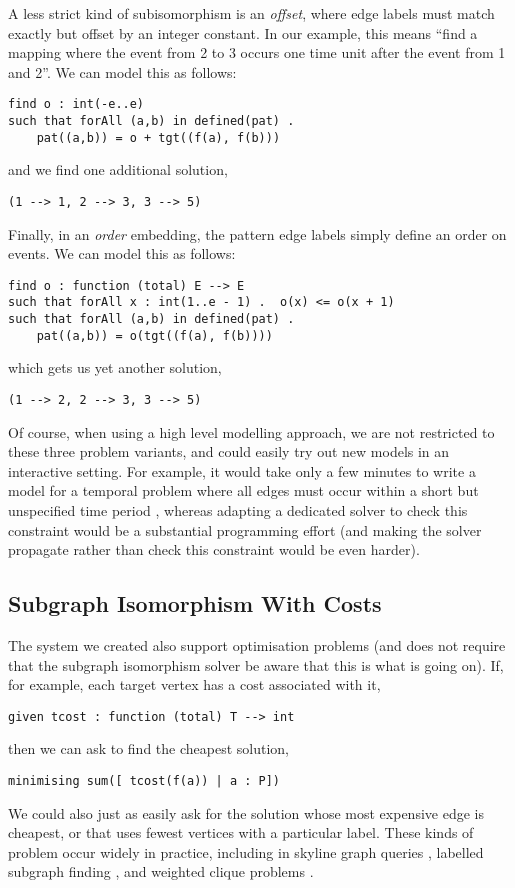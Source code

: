 \documentclass[runningheads]{llncs}
\begin{document}
A less strict kind of subisomorphism is an \emph{offset}, where edge labels must match exactly but
offset by an integer constant. In our example, this means ``find a mapping where the event from 2
to 3 occurs one time unit after the event from 1 and 2''. We can model this as follows:
\begin{lstlisting}
find o : int(-e..e)
such that forAll (a,b) in defined(pat) .
    pat((a,b)) = o + tgt((f(a), f(b)))
\end{lstlisting}
and we find one additional solution,
\begin{lstlisting}
(1 --> 1, 2 --> 3, 3 --> 5)
\end{lstlisting}

Finally, in an \emph{order} embedding, the pattern edge labels simply define an order on events. We
can model this as follows:
\begin{lstlisting}
find o : function (total) E --> E
such that forAll x : int(1..e - 1) .  o(x) <= o(x + 1)
such that forAll (a,b) in defined(pat) .
    pat((a,b)) = o(tgt((f(a), f(b))))
\end{lstlisting}
which gets us yet another solution,
\begin{lstlisting}
(1 --> 2, 2 --> 3, 3 --> 5)
\end{lstlisting}

Of course, when using a high level modelling approach, we are not restricted to these three problem
variants, and could easily try out new models in an interactive setting. For example, it would take
only a few minutes to write a model for a temporal problem where all edges must occur within a short
but unspecified time period \cite{DBLP:conf/asunam/RedmondC13}, whereas adapting a dedicated solver
to check this constraint would be a substantial programming effort (and making the solver propagate
rather than check this constraint would be even harder).

\subsection{Subgraph Isomorphism With Costs}

The system we created also support optimisation problems (and does not require that the subgraph
isomorphism solver be aware that this is what is going on). If, for example, each target vertex has
a cost associated with it,
\begin{lstlisting}
given tcost : function (total) T --> int
\end{lstlisting}
then we can ask to find the cheapest solution,
\begin{lstlisting}
minimising sum([ tcost(f(a)) | a : P])
\end{lstlisting}
We could also just as easily ask for the solution whose most expensive edge is cheapest, or that
uses fewest vertices with a particular label. These kinds of problem occur widely in practice,
including in skyline graph queries \cite{DBLP:journals/pvldb/PandeR017}, labelled subgraph finding
\cite{DBLP:conf/colognetwente/DellOlmoCC11}, and weighted clique problems
\cite{DBLP:conf/cp/McCreeshPST17}.
\end{document}
